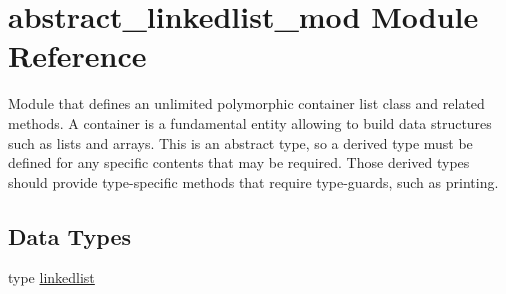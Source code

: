 \hypertarget{namespaceabstract__linkedlist__mod}{}\section{abstract\+\_\+linkedlist\+\_\+mod Module Reference}
\label{namespaceabstract__linkedlist__mod}


Module that defines an unlimited polymorphic container list class and related methods. A container is a fundamental entity allowing to build data structures such as lists and arrays. This is an abstract type, so a derived type must be defined for any specific contents that may be required. Those derived types should provide type-\/specific methods that require type-\/guards, such as printing.  


\subsection*{Data Types}
\begin{DoxyCompactItemize}
\item 
type \mbox{\hyperlink{structabstract__linkedlist__mod_1_1linkedlist}{linkedlist}}
\end{DoxyCompactItemize}
